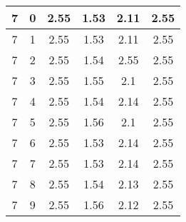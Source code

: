 \begin{longtable}{|c|c||c||c|c||c|}
	7 & 0 & 2.55 & 1.53 & 2.11 & 2.55 \\ \hline
	7 & 1 & 2.55 & 1.53 & 2.11 & 2.55 \\ \hline
	7 & 2 & 2.55 & 1.54 & 2.55 & 2.55 \\ \hline
	7 & 3 & 2.55 & 1.55 & 2.1 & 2.55 \\ \hline
	7 & 4 & 2.55 & 1.54 & 2.14 & 2.55 \\ \hline
	7 & 5 & 2.55 & 1.56 & 2.1 & 2.55 \\ \hline
	7 & 6 & 2.55 & 1.53 & 2.14 & 2.55 \\ \hline
	7 & 7 & 2.55 & 1.53 & 2.14 & 2.55 \\ \hline
	7 & 8 & 2.55 & 1.54 & 2.13 & 2.55 \\ \hline
	7 & 9 & 2.55 & 1.56 & 2.12 & 2.55 \\ \hline
\end{longtable}
\clearpage{}
